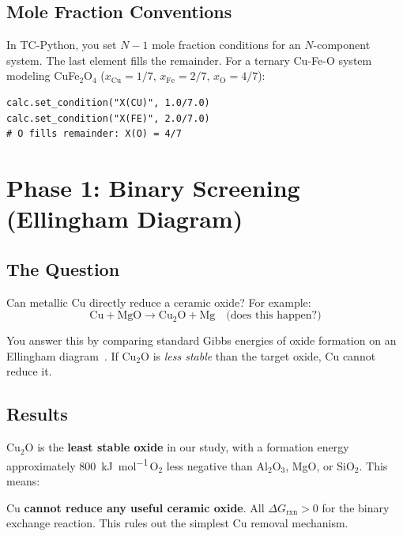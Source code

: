 \documentclass[11pt]{article}
\begin{document}
\subsection{Mole Fraction Conventions}

In TC-Python, you set $N-1$ mole fraction conditions for an $N$-component system. The last element fills the remainder. For a ternary Cu-Fe-O system modeling CuFe$_2$O$_4$ ($x_{\text{Cu}} = 1/7$, $x_{\text{Fe}} = 2/7$, $x_{\text{O}} = 4/7$):

\begin{lstlisting}
calc.set_condition("X(CU)", 1.0/7.0)
calc.set_condition("X(FE)", 2.0/7.0)
# O fills remainder: X(O) = 4/7
\end{lstlisting}


\section{Phase 1: Binary Screening (Ellingham Diagram)}

\subsection{The Question}

Can metallic Cu directly reduce a ceramic oxide? For example:
\[
    \text{Cu} + \text{MgO} \to \text{Cu}_2\text{O} + \text{Mg} \quad \text{(does this happen?)}
\]

You answer this by comparing standard Gibbs energies of oxide formation on an Ellingham diagram~\cite{Gaskell2024, Brown2026CALPHAD}. If Cu$_2$O is \textit{less stable} than the target oxide, Cu cannot reduce it.

\subsection{Results}

Cu$_2$O is the \textbf{least stable oxide} in our study, with a formation energy approximately \SI{800}{\kilo\joule\per\mole}\,O$_2$ less negative than Al$_2$O$_3$, MgO, or SiO$_2$. This means:

\begin{insight}
Cu \textbf{cannot reduce any useful ceramic oxide}. All $\Delta G_{\text{rxn}} > 0$ for the binary exchange reaction. This rules out the simplest Cu removal mechanism.
\end{insight}
\end{document}
